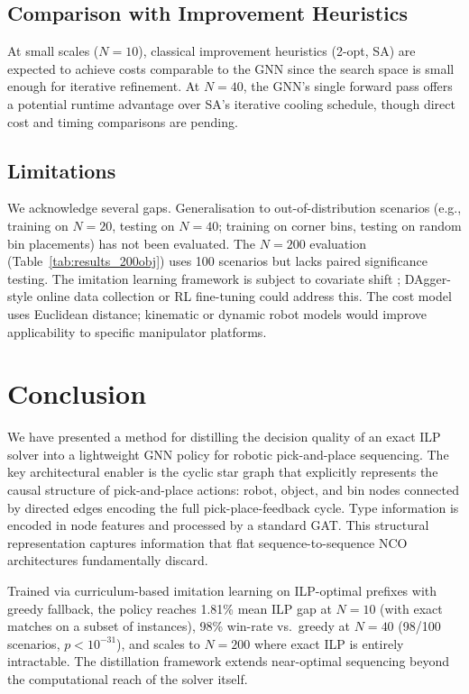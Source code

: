 \documentclass[conference]{IEEEtran}
\begin{document}
\subsection{Comparison with Improvement Heuristics}

At small scales ($N{=}10$), classical improvement heuristics (2-opt, SA) are expected to achieve costs comparable to the GNN since the search space is small enough for iterative refinement. At $N{=}40$, the GNN's single forward pass offers a potential runtime advantage over SA's iterative cooling schedule, though direct cost and timing comparisons are pending.

\subsection{Limitations}

We acknowledge several gaps. Generalisation to out-of-distribution scenarios (e.g., training on $N{=}20$, testing on $N{=}40$; training on corner bins, testing on random bin placements) has not been evaluated. The $N{=}200$ evaluation (Table~\ref{tab:results_200obj}) uses 100 scenarios but lacks paired significance testing. The imitation learning framework is subject to covariate shift \cite{ross2011dagger}; DAgger-style online data collection or RL fine-tuning could address this. The cost model uses Euclidean distance; kinematic or dynamic robot models would improve applicability to specific manipulator platforms.

\section{Conclusion}\label{sec:conclusion}

We have presented a method for distilling the decision quality of an exact ILP solver into a lightweight GNN policy for robotic pick-and-place sequencing. The key architectural enabler is the cyclic star graph that explicitly represents the causal structure of pick-and-place actions: robot, object, and bin nodes connected by directed edges encoding the full pick-place-feedback cycle. Type information is encoded in node features and processed by a standard GAT. This structural representation captures information that flat sequence-to-sequence NCO architectures fundamentally discard.

Trained via curriculum-based imitation learning on ILP-optimal prefixes with greedy fallback, the policy reaches 1.81\% mean ILP gap at $N{=}10$ (with exact matches on a subset of instances), 98\% win-rate vs.\ greedy at $N{=}40$ (98/100 scenarios, $p < 10^{-31}$), and scales to $N{=}200$ where exact ILP is entirely intractable. The distillation framework extends near-optimal sequencing beyond the computational reach of the solver itself.
\end{document}
